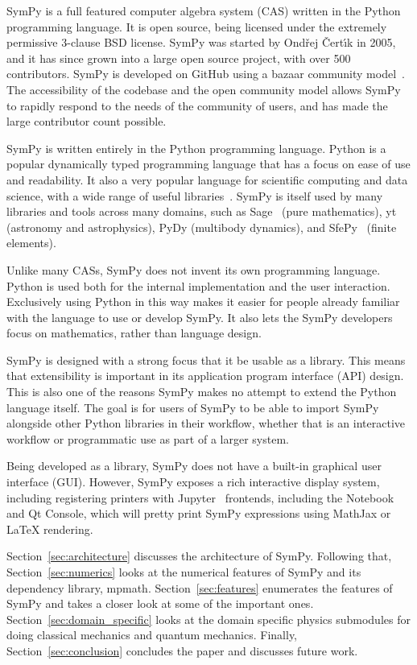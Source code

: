 SymPy is a full featured computer algebra system (CAS) written in the Python
programming language. It is open source, being licensed under the extremely
permissive 3-clause BSD license.
SymPy was started by Ond\v{r}ej \v{C}ert\'{\i}k in 2005, and it has since
grown into a large open source project, with over 500 contributors. SymPy is
developed on GitHub using a bazaar community
model~\cite{raymond1999cathedral}. The accessibility of the codebase and the
open community model allows SymPy to rapidly respond to the needs of the
community of users, and has made the large contributor count possible.

SymPy is written entirely in the Python programming language.
Python is a popular dynamically typed programming language that has a focus on
ease of use and readability. It also a very popular language for scientific
computing and data science, with a wide range of useful
libraries~\cite{oliphant2007python}. SymPy is itself used by many libraries
and tools across many domains, such as Sage~\cite{SAGE} (pure mathematics),
yt~\cite{2011ApJS..192....9T} (astronomy and astrophysics), PyDy
(multibody
dynamics), and SfePy~\cite{cimrman2014sfepy} (finite elements).

Unlike many CASs, SymPy does not invent its own programming language. Python
is used both for the internal implementation and the user interaction.
Exclusively using Python in this way makes it easier for people already
familiar with the language to use or develop SymPy. It also lets the SymPy
developers focus on mathematics, rather than language design.

SymPy is designed with a strong focus that it be usable as a library. This
means that extensibility is important in its application program interface
(API) design. This is also one of the reasons SymPy makes no attempt to extend
the Python language itself. The goal is for users of SymPy to be able to
import SymPy alongside other Python libraries in their workflow, whether that
is an interactive workflow or programmatic use as part of a larger system.

Being developed as a library, SymPy does not have a built-in graphical user
interface (GUI).  However, SymPy exposes a rich interactive display system,
including registering printers with Jupyter~\cite{perez2007ipython} frontends,
including the Notebook and Qt Console, which will pretty print SymPy expressions
using MathJax
or \LaTeX{} rendering.

Section~\ref{sec:architecture} discusses the architecture of SymPy. Following
that, Section~\ref{sec:numerics} looks at the numerical features of SymPy and
its dependency library, mpmath. Section~\ref{sec:features} enumerates the
features of SymPy and takes a closer look at some of the important ones.
Section~\ref{sec:domain_specific} looks at the domain specific physics
submodules for doing classical mechanics and quantum mechanics. Finally,
Section~\ref{sec:conclusion} concludes the paper and discusses future work.
